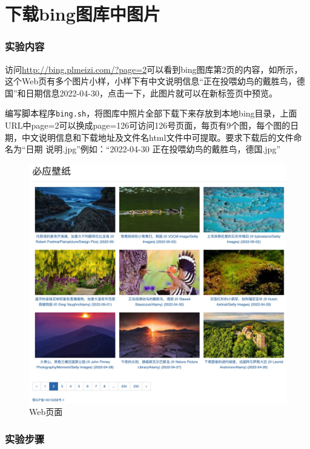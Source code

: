 \documentclass[lang=cn,11pt,a4paper,cite=authornum]{paper}
\begin{document}
\part{下载bing图库中图片}

\section{实验内容}

访问\href{http://bing.plmeizi.com/?page=2}{http://bing.plmeizi.com/?page=2}可以看到bing图库第2页的内容，如所示，这个Web页有多个图片小样，小样下有中文说明信息“正在投喂幼鸟的戴胜鸟，德国”和日期信息2022-04-30，点击一下，此图片就可以在新标签页中预览。

编写脚本程序\texttt{bing.sh}，将图库中照片全部下载下来存放到本地bing目录，上面URL中page=2可以换成page=126可访问126号页面，每页有9个图，每个图的日期，中文说明信息和下载地址及文件名html文件中可提取。要求下载后的文件命名为“日期 说明.jpg”例如：“2022-04-30 正在投喂幼鸟的戴胜鸟，德国.jpg”

\begin{figure}[htbp]
    \centering
    \includegraphics[width=\textwidth]{./images/l3-p3.jpg}
    \caption{Web页面\label{fig:p3}}
\end{figure}

\section{实验步骤}
\end{document}
